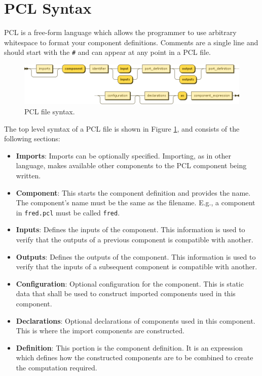 \section{PCL Syntax}
PCL is a free-form language which allows the programmer to use arbitrary whitespace to format your component definitions. Comments are a single line and should start with the \texttt{\#} and can appear at any point in a PCL file.
\begin{figure}[h!]
  \centering
    \includegraphics[scale=\DiagramScale,angle=90]{chapters/compiler/diagrams/component}
  \caption{PCL file syntax.}
  \label{fig:pcl-top-level}
\end{figure}
The top level symtax of a PCL file is shown in Figure \ref{fig:pcl-top-level}, and consists of the following sections:
\begin{itemize}
\item \textbf{Imports}: Imports can be optionally specified. Importing, as in other language, makes available other components to the PCL component being written.
\item \textbf{Component}: This starts the component definition and provides the name. The component's name must be the same as the filename. E.g., a component in \texttt{fred.pcl} must be called \texttt{fred}.
\item \textbf{Inputs}: Defines the inputs of the component. This information is used to verify that the outputs of a previous component is compatible with another.
\item \textbf{Outputs}: Defines the outputs of the component. This information is used to verify that the inputs of a subsequent component is compatible with another.
\item \textbf{Configuration}: Optional configuration for the component. This is static data that shall be used to construct imported components used in this component. 
\item \textbf{Declarations}: Optional declarations of components used in this component. This is where the import components are constructed.
\item \textbf{Definition}: This portion is the component definition. It is an expression which defines how the constructed components are to be combined to create the computation required.
\end{itemize}

